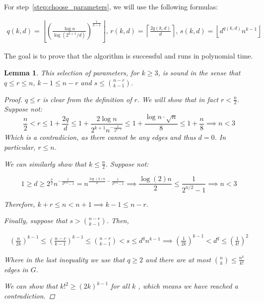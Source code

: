 \documentclass[12pt]{article}
\newtheorem{lemma}[thm]{Lemma}
\begin{document}
    For step~\ref{step:choose_parameters}, we will use the following formulas:

    \begin{align*}
            q(k, d) = \left\lfloor \left(  \frac{\log n}{\log (2^{k+1}/d)} \right)^{\frac{1}{k-1}} \right\rfloor,\,
            r(k, d) = \left \lceil \frac{2q(k, d)}{d} \right \rceil,\,
            s(k, d) = \left\lfloor d^{q(k, d)} n^{k-1} \right\rfloor
    \end{align*}

    The goal is to prove that the algorithm is successful and runs in polynomial time.

    \begin{lemma}
        This selection of parameters, \color{red} for $k \geq 3$, \color{black} is sound in the sense that $q  \leq r \leq n$, $k - 1 \leq n - r$ and $s \leq \binom{n - r}{k - 1}$.

        \begin{proof}
            $q \leq r$ is clear from the definition of $r$.
            We will show that in fact $r < \frac{n}{2}$.
            Suppose not:
            \[
                \frac{n}{2} < r \leq 1 + \frac{2q}{d} \leq 1 + \frac{2 \log n}{2^{k+1}n^{-\frac{1}{2^{k-1}}}}
                \leq 1 + \frac{\log n \cdot \sqrt {n}}{8} \leq 1 + \frac{n}{8} \implies n < 3
            \]
            Which is a contradicion, as there cannot be any edges and thus $d = 0$.
            In particular, $r \leq n$.
     
            We can similarly show that $k \leq \frac{n}{2}$.
            Suppose not:
            
            \[
                1 \geq d \geq 2^{\frac{n}{2}} n^{- \frac{1}{2^{n/2}-1}}
                = n^{\frac{\log(2) n}{2} - \frac{1}{2^{n/2}-1}} \implies
                \frac{\log (2) n}{2} \leq \frac{1}{2^{n/2}-1} \implies n < 3
            \]

            Therefore, $k+r \leq n < n + 1 \implies k - 1 \leq n - r$.

            Finally, suppose that $s > \binom{n - r}{k - 1}$.
            Then,

            \begin{align*}
                \left( \frac{n}{2k} \right)^{k-1} \leq \left( \frac{n-r}{k-1} \right)^{k-1} \leq \binom{n - r}{k - 1} < s \leq d^q n^{k-1}
                \implies  \left( \frac{1}{2k} \right)^{k-1} < d^q \leq \left( \frac{1}{k!} \right)^2
            \end{align*}
            
            Where in the last inequality we use that $q \geq 2$ and there are at most
            $\binom{n}{k} \leq \frac{n^k}{k!}$ edges in $G$.

            We can show that \color{red} $k!^2 \geq (2k)^{k-1}$ for all $k$ %
            \color{black}, which means we have reached a contradiction.

        \end{proof}

    \end{lemma}
\end{document}
